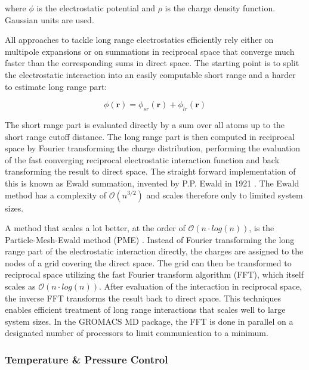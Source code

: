 \documentclass[english, a4paper, 12pt, titlepage, draft]{article}
\newcommand{\vect}[1]{\mathbf{#1}}
\begin{document}
where $\phi$ is the electrostatic potential and $\rho$ is the charge density function.
Gaussian units are used.

All approaches to tackle long range electrostatics efficiently rely either on multipole expansions or on summations in reciprocal space that converge much faster than the corresponding sums in direct space.
The starting point is to split the electrostatic interaction into an easily computable short range and a harder to estimate long range part:

\begin{equation}
    \phi(\vect{r}) = \phi_{sr}(\vect{r}) + \phi_{lr}(\vect{r})
\end{equation}

The short range part is evaluated directly by a sum over all atoms up to the short range cutoff distance.
The long range part is then computed in reciprocal space by Fourier transforming the charge distribution, performing the evaluation of the fast converging reciprocal electrostatic interaction function and back transforming the result to direct space.
The straight forward implementation of this is known as Ewald summation, invented by P.P. Ewald in 1921 \cite{Ewald}.
The Ewald method has a complexity of $\mathcal{O}(n^{3/2})$ and scales therefore only to limited system sizes.

A method that scales a lot better, at the order of $\mathcal{O}(n \cdot log(n))$, is the Particle-Mesh-Ewald method (PME) \cite{PME}.
Instead of Fourier transforming the long range part of the electrostatic interaction directly, the charges are assigned to the nodes of a grid covering the direct space.
The grid can then be transformed to reciprocal space utilizing the fast Fourier transform algorithm (FFT), which itself scales as $\mathcal{O}(n \cdot log(n))$.
After evaluation of the interaction in reciprocal space, the inverse FFT transforms the result back to direct space.
This techniques enables efficient treatment of long range interactions that scales well to large system sizes.
In the GROMACS MD package, the FFT is done in parallel on a designated number of processors to limit communication to a minimum.




\subsubsection{Temperature \& Pressure Control}
\label{sec:tempPressControl}
\end{document}
